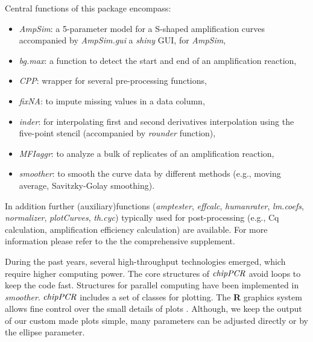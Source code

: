 \documentclass[twocolumn]{bmcart}%
\begin{document}
Central functions of this package encompass: 

\begin{itemize}
\item \textsl{AmpSim}: a 5-parameter model for a 
S-shaped amplification curves accompanied by \textsl{AmpSim.gui} a \emph{shiny} 
GUI, for \textsl{AmpSim},
\item \textsl{bg.max}: a function to detect the start and end of an 
amplification reaction,
\item \textsl{CPP}: wrapper for several pre-processing functions,
\item \textsl{fixNA}: to impute missing values in a data column,
\item \textsl{inder}: for interpolating first and second derivatives 
interpolation using the five-point stencil (accompanied by 
\textsl{rounder} function),
\item \textsl{MFIaggr}: to analyze a bulk of replicates of an amplification 
reaction, 
\item \textsl{smoother}: to smooth the curve data by different methods 
(e.g., moving average, Savitzky-Golay smoothing).
\end{itemize}

In addition further (auxiliary)functions (\textsl{amptester}, 
\textsl{effcalc}, \textsl{humanrater}, \textsl{lm.coefs}, \textsl{normalizer}, 
\textsl{plotCurves}, \textsl{th.cyc}) typically used for post-processing (e.g., 
Cq calculation, amplification efficiency calculation) are available. For more 
information please refer to the the comprehensive supplement.

During the past years, several high-throughput technologies emerged, which 
require higher computing power. The core structures of $\emph{chipPCR}$ avoid 
loops to keep the code fast. Structures for parallel computing have been 
implemented in \textsl{smoother}. $\emph{chipPCR}$ includes a set of classes 
for plotting. The \textbf{R} graphics system allows fine control over the small 
details of plots \cite{Murrell_2012}. Although, we keep the output 
of our custom made plots simple, many parameters can be adjusted directly or by 
the ellipse parameter.
\end{document}
